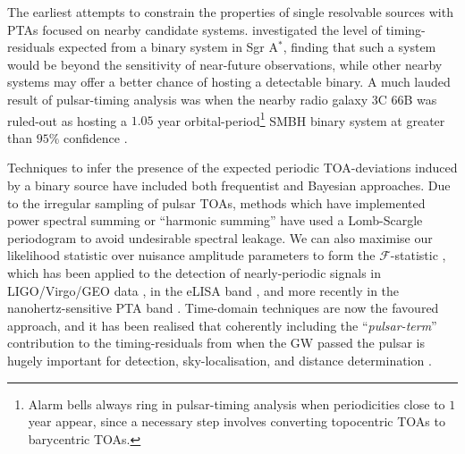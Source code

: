 \documentclass[prd,twocolumn,showpacs,nofootinbib]{revtex4}
\begin{document}
The earliest attempts to constrain the properties of single resolvable sources with PTAs focused on nearby candidate systems. \citet{lommenbacker2001} investigated the level of timing-residuals expected from a binary system in Sgr A$^*$, finding that such a system would be beyond the sensitivity of near-future observations, while other nearby systems may offer a better chance of hosting a detectable binary. A much lauded result of pulsar-timing analysis was when the nearby radio galaxy 3C 66B was ruled-out as hosting a $1.05$ year orbital-period\footnote{Alarm bells always ring in pulsar-timing analysis when periodicities close to $1$ year appear, since a necessary step involves converting topocentric TOAs to barycentric TOAs.} SMBH binary system at greater than $95\%$ confidence \citep{jenet2004_3C66B}.

Techniques to infer the presence of the expected periodic TOA-deviations induced by a binary source have included both frequentist and Bayesian approaches. Due to the irregular sampling of pulsar TOAs, methods which have implemented power spectral summing \citep{yardley-2010} or ``harmonic summing'' \citep{jenet2004_3C66B} have used a Lomb-Scargle periodogram to avoid undesirable spectral leakage. We can also maximise our likelihood statistic over nuisance amplitude parameters to form the $\mathcal{F}$-statistic \citep{Fstat-paper-1998}, which has been applied to the detection of nearly-periodic signals in LIGO/Virgo/GEO data \citep[e.g.,][]{Fstat_virgo2014,Fstat2004,Fstat2007}, in the eLISA band \citep[e.g.,][]{Fstat_LISA2007}, and more recently in the nanohertz-sensitive PTA band \citep{babak-sesana-2012,ellisoptimal2012}. Time-domain techniques are now the favoured approach, and it has been realised that coherently including the ``{\it pulsar-term}'' contribution to the timing-residuals from when the GW passed the pulsar is hugely important for detection, sky-localisation, and distance determination \citep{corbin-cornish-2010,lee-wex-2011}. 
\end{document}
